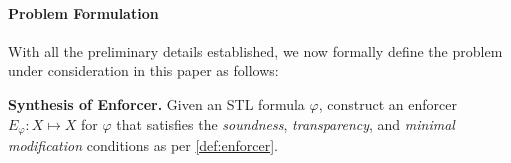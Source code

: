 

    
\paragraph{Problem Formulation}
\label{sec:Problem Formulation}
    With all the preliminary details established, we now formally define the problem under consideration in this paper as follows:
    \begin{tcolorbox}[boxrule=.5pt,colback=white,colframe=black!75]
        \textbf{Synthesis of Enforcer.} Given an STL formula $\varphi$, construct an enforcer $E_{\varphi} : X \mapsto X$ for $\varphi$ that satisfies the \emph{soundness}, \emph{transparency}, and \emph{minimal modification} conditions as per \cref{def:enforcer}.
    \end{tcolorbox}



